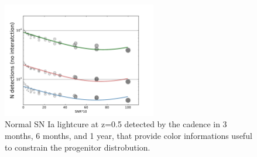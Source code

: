 \begin{figure}[hbt]
  \centerline{
    \includegraphics[width=0.6\textwidth]{figs/transients/LSST_Iadetected_wcolor.pdf}
  }
  \caption{
    Normal SN Ia lightcure at z=0.5 detected by the  cadence in 3 months, 6 months, and 1 year, that provide color informations useful to constrain the progenitor distrobution. }
  \label{fig:sndetect}
\end{figure}


